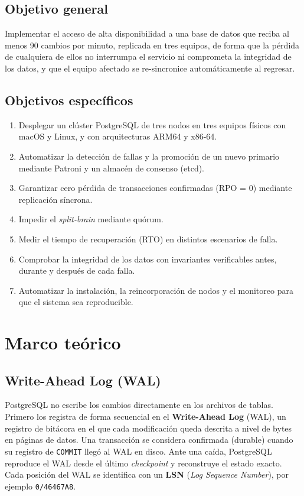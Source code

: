 \documentclass[11pt,a4paper]{article}
\newcommand{\cod}[1]{\texttt{#1}}
\begin{document}
\subsection{Objetivo general}

Implementar el acceso de alta disponibilidad a una base de datos que reciba al menos 90 cambios por minuto, replicada en tres equipos, de forma que la pérdida de cualquiera de ellos no interrumpa el servicio ni comprometa la integridad de los datos, y que el equipo afectado se re-sincronice automáticamente al regresar.

\subsection{Objetivos específicos}

\begin{enumerate}
  \item Desplegar un clúster PostgreSQL de tres nodos en tres equipos físicos con macOS y Linux, y con arquitecturas ARM64 y x86-64.
  \item Automatizar la detección de fallas y la promoción de un nuevo primario mediante Patroni y un almacén de consenso (etcd).
  \item Garantizar cero pérdida de transacciones confirmadas (RPO = 0) mediante replicación síncrona.
  \item Impedir el \emph{split-brain} mediante quórum.
  \item Medir el tiempo de recuperación (RTO) en distintos escenarios de falla.
  \item Comprobar la integridad de los datos con invariantes verificables antes, durante y después de cada falla.
  \item Automatizar la instalación, la reincorporación de nodos y el monitoreo para que el sistema sea reproducible.
\end{enumerate}

\section{Marco teórico}

\subsection{Write-Ahead Log (WAL)}

PostgreSQL no escribe los cambios directamente en los archivos de tablas. Primero los registra de forma secuencial en el \textbf{Write-Ahead Log} (WAL), un registro de bitácora en el que cada modificación queda descrita a nivel de bytes en páginas de datos. Una transacción se considera confirmada (durable) cuando su registro de \cod{COMMIT} llegó al WAL en disco. Ante una caída, PostgreSQL reproduce el WAL desde el último \emph{checkpoint} y reconstruye el estado exacto. Cada posición del WAL se identifica con un \textbf{LSN} (\emph{Log Sequence Number}), por ejemplo \cod{0/46467A8}.
\end{document}
